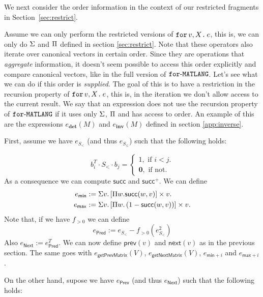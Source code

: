 
We next consider the order information in the context of our restricted fragments in Section~\ref{sec:restrict}.

Assume we can only perform the restricted versions of $\texttt{for}\, v,X \texttt{.}\, e$, this is, we can only do 
$\Sigma$ and $\Pi$ defined in section \ref{sec:restrict}. Note that these operators also iterate over canonical vectors
in certain order. Since they are operations that \textit{aggregate} information, it doesn't seem
possible to access this order explicitly and compare canonical vectors, like in the full version of $\texttt{for}\text{-}\texttt{MATLANG}$.
Let's see what we can do if this order is \textit{supplied}. 
The goal of this is to have a restriction in the recursion property of $\texttt{for}\, v,X \texttt{.}\, e$, this is, 
in the iteration we don't allow access to the current result.
We say that an expression does not use the recursion property of $\texttt{for}\text{-}\texttt{MATLANG}$ if it uses
only $\Sigma$, $\Pi$ and has access to order.
An example of this are the expressions $e_{\mathbf{det}}(M)$ and $e_{\mathbf{inv}}(M)$ defined 
in section \ref{app:inverse}.

First, assume we have $e_{S_{<}}$ (and thus $e_{S_{\leq}}$) such that the following holds:

$$
b_i^T\cdot S_{<} \cdot b_j=\begin{cases}
               1, \text{ if } i < j.\\
              \mathbf{0}, \text{ if not.}
            \end{cases}
$$
As a consequence we
can compute $\mathsf{succ}$ and $\mathsf{succ}^+$. We can define
\begin{align*}
  e_{\mathsf{min}}&:=\Sigma v. \left[ \Pi w. \mathsf{succ}(w,v)\right] \times v. \\
  e_{\mathsf{max}}&:=\Sigma v. \left[ \Pi w. \left( 1-\mathsf{succ}(w,v) \right) \right] \times v.
\end{align*}
Note that, if we have $f_{>0}$ we can define
$$
e_{\mathsf{Pred}}:= e_{S_{<}}- f_{>0}(e_{S_{<}}^2)
$$
Also $e_{\mathsf{Next}}:=e_{\mathsf{Pred}}^T$.
We can now define $\mathsf{prev}(v)$ and $\mathsf{next}(v)$ as in the previous section. 
The same goes with $e_{\mathsf{getPrevMatrix}}(V)$, 
$e_{\mathsf{getNextMatrix}}(V)$, $e_{\mathsf{min}+i}$ and $e_{\mathsf{max}+i}$.

On the other hand, supose we have $e_{\mathsf{Prev}}$
(and thus $e_{\mathsf{Next}}$) such that the following holds:

